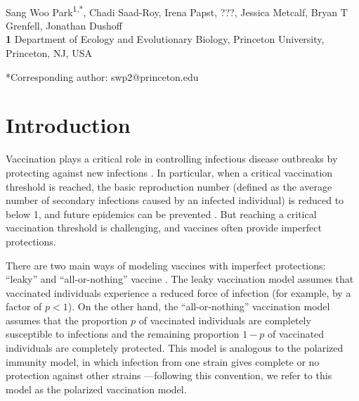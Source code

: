 \documentclass[12pt]{article}
\date{\today}
\begin{document}
\begin{flushleft}{
	\Large
	\textbf{}
}
\newline
\\
Sang Woo Park\textsuperscript{1,*}, Chadi Saad-Roy, Irena Papst, ???, Jessica Metcalf, Bryan T Grenfell, Jonathan Dushoff
\\
\bigskip
\textbf{1} Department of Ecology and Evolutionary Biology, Princeton University, Princeton, NJ, USA
\\
\bigskip

*Corresponding author: swp2@princeton.edu
\end{flushleft}

\section*{Introduction}

Vaccination plays a critical role in controlling infectious disease outbreaks by protecting against new infections \citep{iwasaki2020and}.
In particular, when a critical vaccination threshold is reached, the basic reproduction number (defined as the average number of secondary infections caused by an infected individual) is reduced to below 1, and future epidemics can be prevented \citep{anderson1985vaccination}.
But reaching a critical vaccination threshold is challenging, and vaccines often provide imperfect protections.

There are two main ways of modeling vaccines with imperfect protections: ``leaky'' and ``all-or-nothing'' vaccine \citep{smith1984assessment}.
The leaky vaccination model assumes that vaccinated individuals experience a reduced force of infection (for example, by a factor of $p < 1$).
On the other hand, the ``all-or-nothing'' vaccination model assumes that the proportion $p$ of vaccinated individuals are completely susceptible to infections and the remaining proportion $1-p$ of vaccinated individuals are completely protected.
This model is analogous to the polarized immunity model, in which infection from one strain gives complete or no protection against other strains \citep{gog2002dynamics}---following this convention, we refer to this model as the polarized vaccination model.
\end{document}
